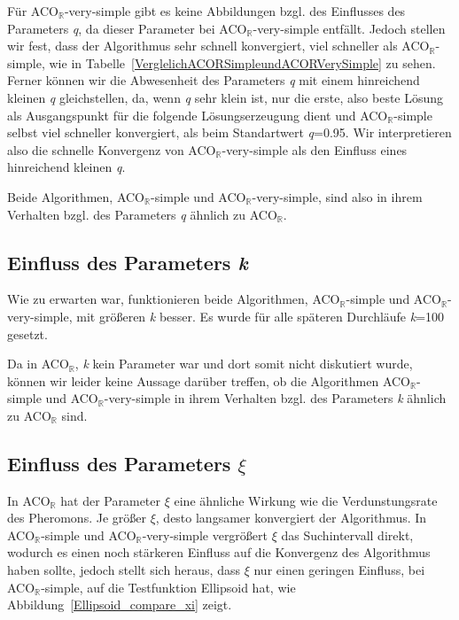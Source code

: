 \documentclass[fontsize=12, a4aper]{scrartcl}
\begin{document}
	Für ACO\(_{\mathbb{R}}\)-very-simple gibt es keine Abbildungen bzgl. des Einflusses des Parameters \textit{q}, da dieser Parameter bei ACO\(_{\mathbb{R}}\)-very-simple entfällt. Jedoch stellen wir fest, dass der Algorithmus sehr schnell konvergiert, viel schneller als ACO\(_{\mathbb{R}}\)-simple, wie in Tabelle~\ref{VerglelichACORSimpleundACORVerySimple} zu sehen. Ferner können wir die Abwesenheit des Parameters \textit{q} mit einem hinreichend kleinen \textit{q} gleichstellen, da, wenn \textit{q} sehr klein ist, nur die erste, also beste Lösung als Ausgangspunkt für die folgende Lösungserzeugung dient und ACO\(_{\mathbb{R}}\)-simple selbst viel schneller konvergiert, als beim Standartwert \textit{q}=0.95. Wir interpretieren also die schnelle Konvergenz von ACO\(_{\mathbb{R}}\)-very-simple als den Einfluss eines hinreichend kleinen \textit{q}.\hfill\newline
	
	Beide Algorithmen, ACO\(_{\mathbb{R}}\)-simple und ACO\(_{\mathbb{R}}\)-very-simple, sind also in ihrem Verhalten bzgl. des Parameters \textit{q} ähnlich zu ACO\(_{\mathbb{R}}\).
	
	\subsection{Einfluss des Parameters \textit{k}}
	
	Wie zu erwarten war, funktionieren beide Algorithmen, ACO\(_{\mathbb{R}}\)-simple und ACO\(_{\mathbb{R}}\)-very-simple, mit größeren \textit{k} besser. Es wurde für alle späteren Durchläufe \textit{k}=100 gesetzt.\hfill\newline
	
	\noindent Da in ACO\(_{\mathbb{R}}\), \textit{k} kein Parameter war und dort somit nicht diskutiert wurde, können wir leider keine Aussage darüber treffen, ob die Algorithmen ACO\(_{\mathbb{R}}\)-simple und ACO\(_{\mathbb{R}}\)-very-simple in ihrem Verhalten bzgl. des Parameters \textit{k} ähnlich zu ACO\(_{\mathbb{R}}\) sind.
	
	\subsection{Einfluss des Parameters \(\xi\)}
	
	In ACO\(_{\mathbb{R}}\) hat der Parameter \(\xi\) eine ähnliche Wirkung wie die Verdunstungsrate des Pheromons. Je größer \(\xi\), desto langsamer konvergiert der Algorithmus. In ACO\(_{\mathbb{R}}\)-simple und ACO\(_{\mathbb{R}}\)-very-simple vergrößert \(\xi\) das Suchintervall direkt, wodurch es einen noch stärkeren Einfluss auf die Konvergenz des Algorithmus haben sollte, jedoch stellt sich heraus, dass \(\xi\) nur einen geringen Einfluss, bei ACO\(_{\mathbb{R}}\)-simple, auf die Testfunktion \glqq Ellipsoid\grqq \hspace{.16667em} hat, wie Abbildung~\ref{Ellipsoid_compare_xi} zeigt.\hfill\newline
	
\end{document}
